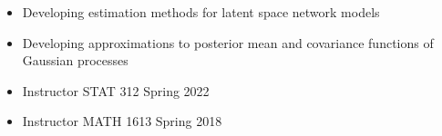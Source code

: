

\begin{itemize}
\item Developing estimation methods for latent space network models
\item Developing approximations to posterior mean and covariance functions of Gaussian processes
\item Instructor STAT 312 Spring 2022
\end{itemize}

\divider
\medskip


\divider
\medskip

\begin{itemize}
\item Instructor MATH 1613 Spring 2018
\end{itemize}






